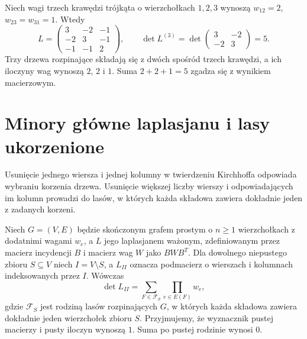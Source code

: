 \begin{przyklad}
Niech wagi trzech krawędzi trójkąta o wierzchołkach
$1,2,3$ wynoszą $w_{12}=2$, $w_{23}=w_{31}=1$.
Wtedy
\[
L=\begin{pmatrix}3&-2&-1\\-2&3&-1\\-1&-1&2\end{pmatrix},
\qquad
\det L^{(3)}=\det\begin{pmatrix}3&-2\\-2&3\end{pmatrix}=5.
\]
Trzy drzewa rozpinające składają się z dwóch spośród
trzech krawędzi, a ich iloczyny wag wynoszą $2$, $2$
i $1$. Suma $2+2+1=5$ zgadza się z wynikiem macierzowym.
\end{przyklad}

\begin{center}
\end{center}

\section{Minory główne laplasjanu i lasy ukorzenione}
\label{sec:tg-rooted-forests}

Usunięcie jednego wiersza i jednej kolumny w twierdzeniu
Kirchhoffa odpowiada wybraniu korzenia drzewa.
Usunięcie większej liczby wierszy i odpowiadających im
kolumn prowadzi do lasów, w których każda składowa
zawiera dokładnie jeden z zadanych korzeni.

\begin{twierdzenie}
\label{thm:tg-rooted-forest-minor}
Niech $G=(V,E)$ będzie skończonym grafem prostym
o $n\geq1$ wierzchołkach z dodatnimi wagami $w_e$,
a $L$ jego laplasjanem ważonym, zdefiniowanym przez
macierz incydencji $B$ i macierz wag $W$ jako $BWB^T$.
Dla dowolnego niepustego zbioru $S\subseteq V$ niech
$I=V\setminus S$, a $L_{II}$ oznacza podmacierz
o wierszach i kolumnach indeksowanych przez $I$. Wówczas
\[
\det L_{II}=\sum_{F\in\mathcal F_S}\prod_{e\in E(F)}w_e,
\]
gdzie $\mathcal F_S$ jest rodziną lasów rozpinających $G$,
w których każda składowa zawiera dokładnie jeden
wierzchołek zbioru $S$. Przyjmujemy, że wyznacznik
pustej macierzy i pusty iloczyn wynoszą $1$.
Suma po pustej rodzinie wynosi $0$.
\end{twierdzenie}

